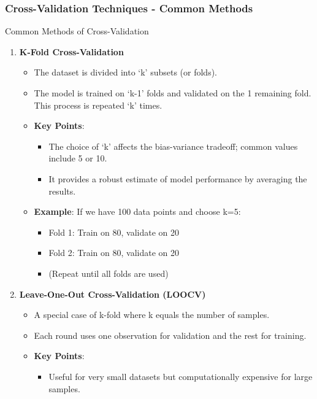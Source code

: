 \documentclass{beamer}
\begin{document}
\begin{frame}[fragile]
    \frametitle{Cross-Validation Techniques - Common Methods}
    \begin{block}{Common Methods of Cross-Validation}
        \begin{enumerate}
            \item \textbf{K-Fold Cross-Validation}
                \begin{itemize}
                    \item The dataset is divided into ‘k’ subsets (or folds).
                    \item The model is trained on ‘k-1’ folds and validated on the 1 remaining fold. This process is repeated ‘k’ times.
                    \item \textbf{Key Points}:
                        \begin{itemize}
                            \item The choice of ‘k’ affects the bias-variance tradeoff; common values include 5 or 10.
                            \item It provides a robust estimate of model performance by averaging the results.
                        \end{itemize}
                    \item \textbf{Example}:
                        If we have 100 data points and choose k=5:
                        \begin{itemize}
                            \item Fold 1: Train on 80, validate on 20
                            \item Fold 2: Train on 80, validate on 20
                            \item (Repeat until all folds are used)
                        \end{itemize}
                \end{itemize}
                
            \item \textbf{Leave-One-Out Cross-Validation (LOOCV)}
                \begin{itemize}
                    \item A special case of k-fold where k equals the number of samples.
                    \item Each round uses one observation for validation and the rest for training.
                    \item \textbf{Key Points}:
                        \begin{itemize}
                            \item Useful for very small datasets but computationally expensive for large samples.
                        \end{itemize}
                \end{itemize}
                

\end{enumerate}
\end{block}
\end{frame}
\end{document}
